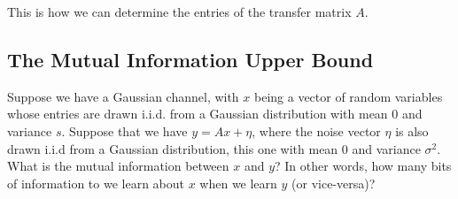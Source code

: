 \documentclass[11pt]{article}
\begin{document}


This is how we can determine the entries of the transfer matrix $A$.




\subsection{The Mutual Information Upper Bound}

Suppose we have a Gaussian channel, with $x$ being a vector of random variables whose entries are drawn i.i.d. from a Gaussian distribution with mean 0 and variance $s$. Suppose that we have $y = Ax + \eta$, where the noise vector $\eta$ is also drawn i.i.d from a Gaussian distribution, this one with mean 0 and variance $\sigma^2$. What is the mutual information between $x$ and $y$? In other words, how many bits of information to we learn about $x$ when we learn $y$ (or vice-versa)?
\end{document}
